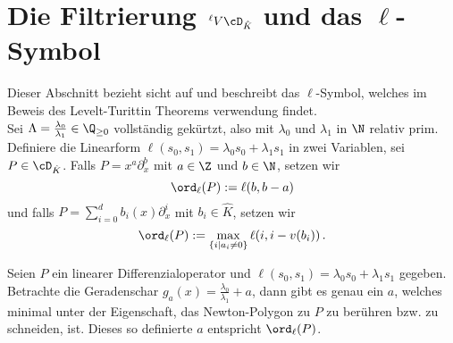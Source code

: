 \section{Die Filtrierung $\,^\ell V\cD_{\hat K}$ und das $\ell$-Symbol}
\begin{comment}
TODO: Problem mit vertikaler verschiebung? kompensieren??
\end{comment}
Dieser Abschnitt bezieht sicht auf \cite[Seite 25]{sabbah_cimpa90} und
beschreibt das $\ell$-Symbol, welches im Beweis des Levelt-Turittin Theorems
verwendung findet.\\
Sei $\Lambda=\frac{\lambda_0}{\lambda_1}\in \Q_{\geq 0}$ vollständig gekürtzt,
also mit $\lambda_0$ und $\lambda_1$ in $\N$ relativ prim. Definiere die
Linearform $\ell(s_0,s_1)=\lambda_0s_0+\lambda_1s_1$ in zwei Variablen, sei
$P\in\cD_{\hat K}$.  Falls $P=x^a\partial_x^b$ mit $a\in \Z$ und $b\in \N$,
setzen wir
\[
\ord_\ell(P):=\ell(b,b-a)
\]
und falls $P=\sum_{i=0}^d b_i(x)\partial_x^i$ mit $b_i\in\hat K$, setzen wir
\[
\ord_\ell(P):=\max_{\{i\mid a_i\neq 0\}} \ell(i,i-v(b_i))\,.
\]

\begin{bem}
Seien $P$ ein linearer Differenzialoperator und
$\ell(s_0,s_1)=\lambda_0s_0+\lambda_1s_1$ gegeben.
Betrachte die Geradenschar $g_a(x)=\frac{\lambda_0}{\lambda_1}+a$, dann gibt es
genau ein $a$, welches minimal unter der Eigenschaft, das Newton-Polygon zu $P$
zu berühren bzw. zu schneiden, ist.
Dieses so definierte $a$ entspricht $\ord_\ell(P)$.
\end{bem}

